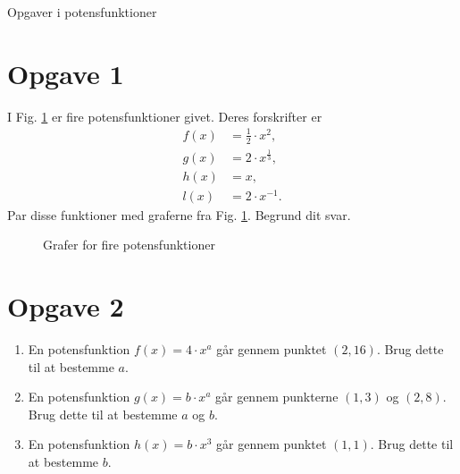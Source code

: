 
\begin{center}
\Huge
Opgaver i potensfunktioner
\end{center}
\section*{Opgave 1}

I Fig. \ref{fig:potensfunktioner} er fire potensfunktioner givet. Deres forskrifter er 
\begin{align*}
f(x) &= \frac{1}{2}\cdot x^2,\\
g(x) &= 2\cdot x^{\frac{1}{3}},\\
h(x) &= x,\\
l(x) &= 2\cdot x^{-1}.
\end{align*}
Par disse funktioner med graferne fra Fig. \ref{fig:potensfunktioner}. Begrund dit svar.
\begin{figure}[H]
\centering
{}
\caption{Grafer for fire potensfunktioner}
\label{fig:potensfunktioner}
\end{figure}

\section*{Opgave 2}
\begin{enumerate}[label=\roman*)]
\item En potensfunktion $f(x) = 4\cdot x^a$ går gennem punktet $(2,16)$. Brug dette til at bestemme $a$.
\item En potensfunktion $g(x) = b\cdot x^a$ går gennem punkterne $(1,3)$ og $(2,8)$. Brug dette til at bestemme $a$ og $b$.
\item En potensfunktion $h(x) = b\cdot x^3$ går gennem punktet $(1,1)$. Brug dette til at bestemme $b$. 
\end{enumerate}
